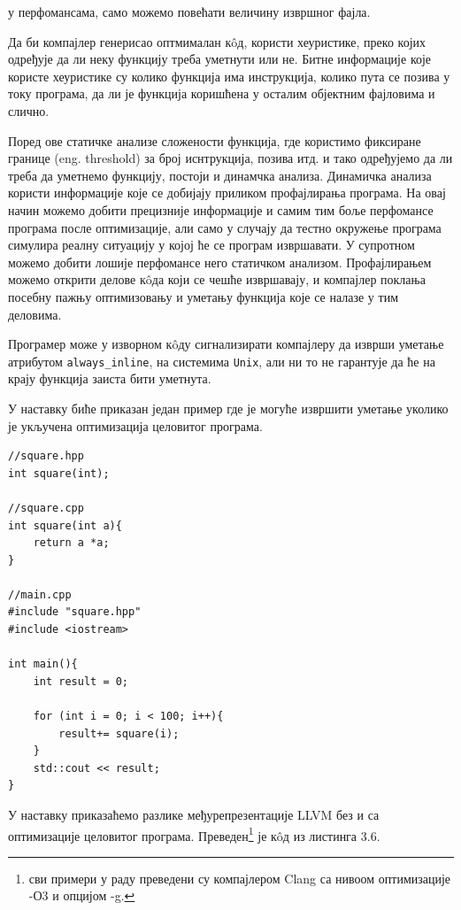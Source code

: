 \documentclass[12pt,oneside]{memoir}
\begin{document}
у перфомансама, само можемо повећати величину извршног фајла.
\par
Да би компајлер генерисао оптмималан к\^{o}д, користи хеуристике, преко којих одређује
да ли неку функцију треба уметнути или не.
Битне информације које користе хеуристике су колико функција има инструкција,
колико пута се позива у току програма, да ли је функција коришћена у осталим
објектним фајловима и слично.
\par
Поред ове статичке анализе сложености функција, где користимо фиксиране границе (eng. threshold)
за број иснтрукција, позива итд. и тако одређујемо да ли треба да уметнемо функцију,
постоји и динамчка анализа.
Динамичка анализа користи информације које се добијају приликом профајлирања програма.
На овај начин можемо добити прецизније информације и самим тим боље перфомансе програма после оптимизације,
али само у случају да тестно окружење програма симулира реалну ситуацију у којој
ће се програм извршавати.
У супротном можемо добити лошије перфомансе него статичком анализом.
Профајлирањем можемо открити делове к\^{o}да који се чешће извршавају, и компајлер 
поклања посебну пажњу оптимизовању и уметању функција које се налазе у тим деловима.

Програмер може у изворном  к\^{o}ду сигнализирати компајлеру да изврши уметање
атрибутом \texttt {always{\_}inline}, на системима \texttt{Unix}, али ни то не гарантује да ће на крају
функција заиста бити уметнута.
\par
У наставку биће приказан један пример где је могуће извршити уметање уколико
је укључена оптимизација целовитог програма.

\begin{lstlisting}[frame=single,caption={Пример уметања функције}, captionpos=b]
//square.hpp           
int square(int);         
    					
//square.cpp				
int square(int a){
    return a *a;
}

//main.cpp
#include "square.hpp"
#include <iostream>

int main(){
    int result = 0;
    
    for (int i = 0; i < 100; i++){
        result+= square(i);
    }
    std::cout << result;
}

\end{lstlisting}

У наставку приказаћемо разлике међурепрезентације LLVM без и са оптимизације
целовитог програма. Преведен\footnote{сви примери у раду преведени су компајлером Clang са нивоом оптимизације -О3 и опцијом -g.} је к\^{o}д из листинга 3.6.
\end{document}

